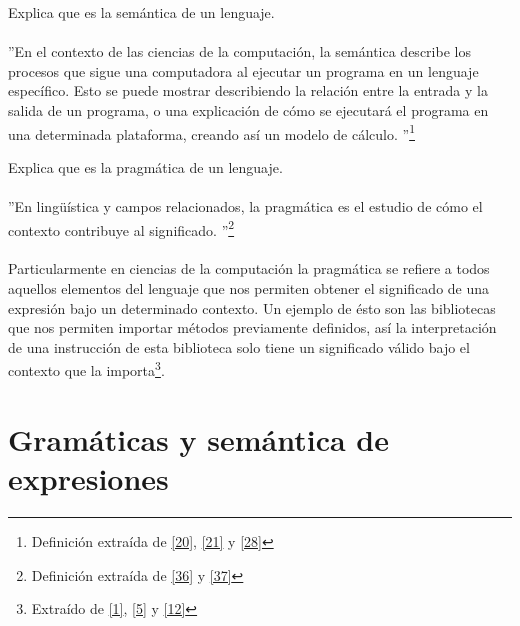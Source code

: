     \begin{exercise}
       Explica que es la semántica de un lenguaje.    \\\\
        ''En el contexto de las ciencias de la computación, la semántica describe los procesos que sigue una computadora al ejecutar un programa en un lenguaje específico. Esto se puede mostrar describiendo la relación entre la entrada y la salida de un programa, o una explicación de cómo se ejecutará el programa en una determinada plataforma, creando así un modelo de cálculo. ''\footnote{Definición extraída de \hyperlink{20}{[20]},  \hyperlink{21}{[21]} y \hyperlink{28}{[28]}}
    \end{exercise} 


    \begin{exercise}
        Explica que es la pragmática de un lenguaje.   \\\\
         ''En lingüística y campos relacionados, la pragmática es el estudio de cómo el contexto contribuye al significado. ''\footnote{Definición extraída de  \hyperlink{36}{[36]} y \hyperlink{37}{[37]}}\\\\
        Particularmente en ciencias de la computación la pragmática se refiere a todos aquellos elementos del lenguaje que nos permiten obtener el significado de una expresión bajo un determinado contexto.
        Un ejemplo de ésto son las bibliotecas que nos permiten importar métodos previamente definidos, así la interpretación de una instrucción de esta biblioteca solo tiene un significado válido bajo el contexto que la importa\footnote{Extraído de  \hyperlink{1}{[1]},  \hyperlink{5}{[5]} y   \hyperlink{12}{[12]}}.
    \end{exercise} 

    \bigskip

\section{Gramáticas y semántica de expresiones}

